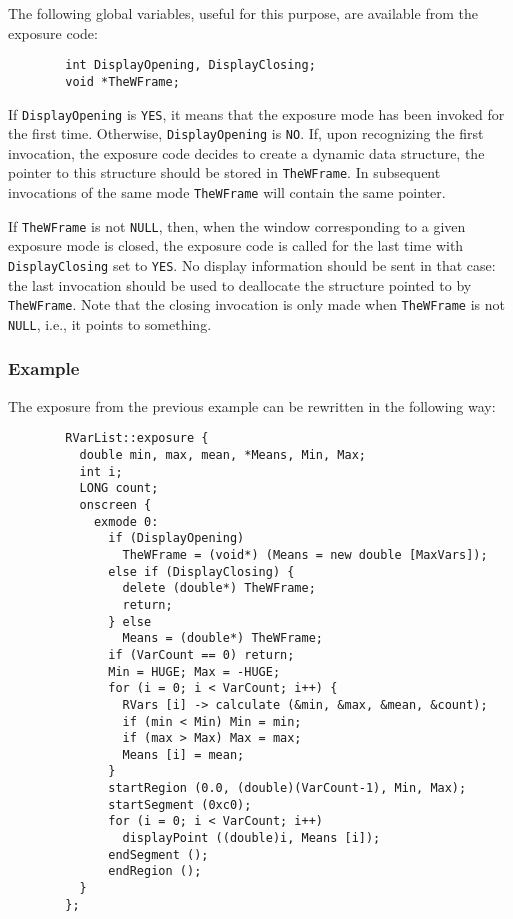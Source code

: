The following global variables, useful for this purpose,
are available from the exposure code:
\begin{verbatim}
        int DisplayOpening, DisplayClosing;
        void *TheWFrame;
\end{verbatim}

If {\tt DisplayOpening} is {\tt YES}, it means that the exposure mode
has been invoked for the first time.
Otherwise, {\tt DisplayOpening} is {\tt NO}.
If, upon recognizing the first invocation, the exposure code decides to
create a dynamic data structure, the pointer to this structure should be
stored in {\tt TheWFrame}.
In subsequent invocations of the same mode
{\tt TheWFrame} will contain the same pointer.

If {\tt TheWFrame} is not {\tt NULL}, then, when the window corresponding
to a given exposure mode is closed, the exposure code is called for the
last time with {\tt DisplayClosing} set to {\tt YES}.
No display information should be sent in that case: the last invocation
should be used to deallocate the structure pointed to by {\tt TheWFrame}.
Note that the closing invocation is only made when {\tt TheWFrame} is not
{\tt NULL}, i.e., it points to something.

\subsubsection*{Example}

\noindent
The exposure from the previous example can be rewritten in the following way:

\begin{verbatim}
        RVarList::exposure {
          double min, max, mean, *Means, Min, Max;
          int i;
          LONG count;
          onscreen {
            exmode 0:
              if (DisplayOpening)
                TheWFrame = (void*) (Means = new double [MaxVars]);
              else if (DisplayClosing) {
                delete (double*) TheWFrame;
                return;
              } else
                Means = (double*) TheWFrame;
              if (VarCount == 0) return;
              Min = HUGE; Max = -HUGE;
              for (i = 0; i < VarCount; i++) {
                RVars [i] -> calculate (&min, &max, &mean, &count);
                if (min < Min) Min = min;
                if (max > Max) Max = max;
                Means [i] = mean;
              }
              startRegion (0.0, (double)(VarCount-1), Min, Max);
              startSegment (0xc0);
              for (i = 0; i < VarCount; i++)
                displayPoint ((double)i, Means [i]);
              endSegment ();
              endRegion ();
          }
        };
\end{verbatim}

